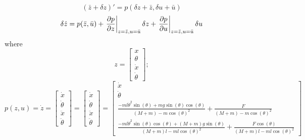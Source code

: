 \documentclass[12pt,letterpaper]{article}
\begin{document}
\begin{enumerate}
        \begin{equation*}
            (\bar z + \delta z)' = p(\delta z + \bar z, \delta u + \bar u)
        \end{equation*}
        \begin{equation*}
          \delta \dot z = p (\bar z, \bar u) + \eval{\pdv{p}{z}}_{z = \bar z, u = \bar u} \delta z + \eval{\pdv{p}{u}}_{z = \bar z, u = \bar u} \delta u 
        \end{equation*}
        where 
        \begin{equation*}
            z = \begin{bmatrix}
                    x \\ \theta \\ \dot x \\ \dot \theta 
                \end{bmatrix};
        \end{equation*}
        \begin{equation*}
            p(z,u) = \dot z   = \begin{bmatrix}
                                    \dot x \\ \dot\theta \\ \ddot x \\ \ddot \theta 
                                \end{bmatrix}
                                =
                                \begin{bmatrix}
                                    \dot x \\ \dot\theta \\ \ddot x \\ \ddot \theta 
                                \end{bmatrix}
                                =
                                \begin{bmatrix}
                                    \dot x \\ \dot\theta 
                                    \\ \frac{-ml \dot\theta^2\sin(\theta) + mg\sin(\theta)\cos(\theta)}{(M+m) - m\cos(\theta)^2}  + 
                                    \frac{F}{(M+m) - m\cos(\theta)^2} 
                                    \\ \frac{-ml\dot\theta^2\sin(\theta)\cos(\theta) + (M+m)g\sin(\theta)}{(M+m)l - ml\cos(\theta)^2} +
                                     \frac{F\cos(\theta)}{(M+m)l - ml\cos(\theta)^2} 
                                \end{bmatrix}

\end{equation*}
\end{enumerate}
\end{document}

